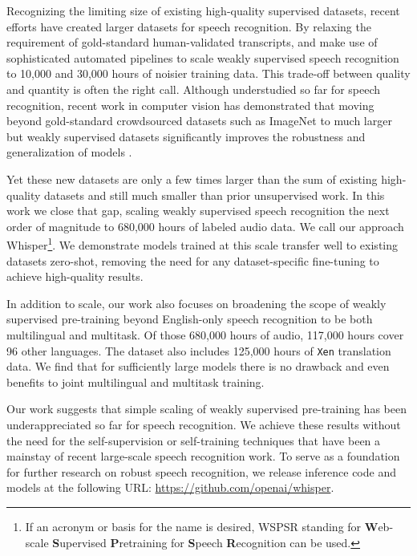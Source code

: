 \documentclass[nohyperref]{article}
\theoremstyle{plain}
\theoremstyle{definition}
\theoremstyle{remark}
\begin{document}
Recognizing the limiting size of existing high-quality supervised datasets, recent efforts have created larger datasets for speech recognition. By relaxing the requirement of gold-standard human-validated transcripts, \citet{chen2021gigaspeech} and \citet{galvez2021people} make use of sophisticated automated pipelines to scale weakly supervised speech recognition to 10,000 and 30,000 hours of noisier training data. This trade-off between quality and quantity is often the right call. Although understudied so far for speech recognition, recent work in computer vision has demonstrated that moving beyond gold-standard crowdsourced datasets such as ImageNet \cite{russakovsky2015imagenet} to much larger but weakly supervised datasets significantly improves the robustness and generalization of models \cite{mahajan2018exploring,kolesnikov2020big}.

Yet these new datasets are only a few times larger than the sum of existing high-quality datasets and still much smaller than prior unsupervised work. In this work we close that gap, scaling weakly supervised speech recognition the next order of magnitude to 680,000 hours of labeled audio data. We call our approach Whisper\footnote{If an acronym or basis for the name is desired, WSPSR standing for \textbf{W}eb-scale \textbf{S}upervised \textbf{P}retraining for \textbf{S}peech \textbf{R}ecognition can be used.}. We demonstrate models trained at this scale transfer well to existing datasets zero-shot, removing the need for any dataset-specific fine-tuning to achieve high-quality results.

In addition to scale, our work also focuses on broadening the scope of weakly supervised pre-training beyond English-only speech recognition to be both multilingual and multitask. Of those 680,000 hours of audio, 117,000 hours cover 96 other languages. The dataset also includes 125,000 hours of \texttt{Xen} translation data. We find that for sufficiently large models there is no drawback and even benefits to joint multilingual and multitask training.

Our work suggests that simple scaling of weakly supervised pre-training has been underappreciated so far for speech recognition. We achieve these results without the need for the self-supervision or self-training techniques that have been a mainstay of recent large-scale speech recognition work. To serve as a foundation for further research on robust speech recognition, we release inference code and models at the following URL: \url{https://github.com/openai/whisper}.
\end{document}
